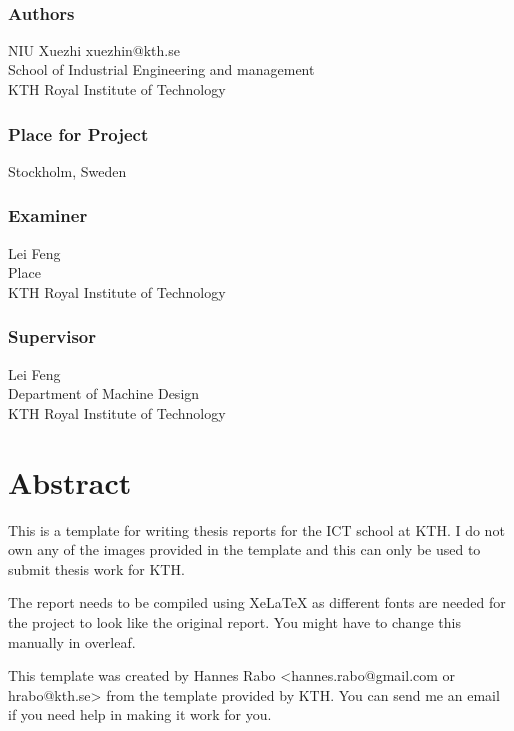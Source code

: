\newpage
\thispagestyle{plain}
~\\
\vfill
{ 
	\subsection*{Authors}
	NIU Xuezhi xuezhin@kth.se\\
	School of Industrial Engineering and management\\
	KTH Royal Institute of Technology
	
	\subsection*{Place for Project}
	Stockholm, Sweden
	
	\subsection*{Examiner}
	Lei Feng \\
	Place \\
	KTH Royal Institute of Technology
	
	\subsection*{Supervisor }
	Lei Feng\\
    Department of Machine Design\\
	KTH Royal Institute of Technology
	~
}


\newpage
\thispagestyle{plain}
\chapter*{Abstract}

This is a template for writing thesis reports for the ICT school at KTH. I do not own any of the images provided in the template and this can only be used to submit thesis work for KTH.

The report needs to be compiled using XeLaTeX as different fonts are needed for the project to look like the original report. You might have to change this manually in overleaf.

This template was created by Hannes Rabo <hannes.rabo@gmail.com or hrabo@kth.se> from the template provided by KTH. You can send me an email if you need help in making it work for you.


